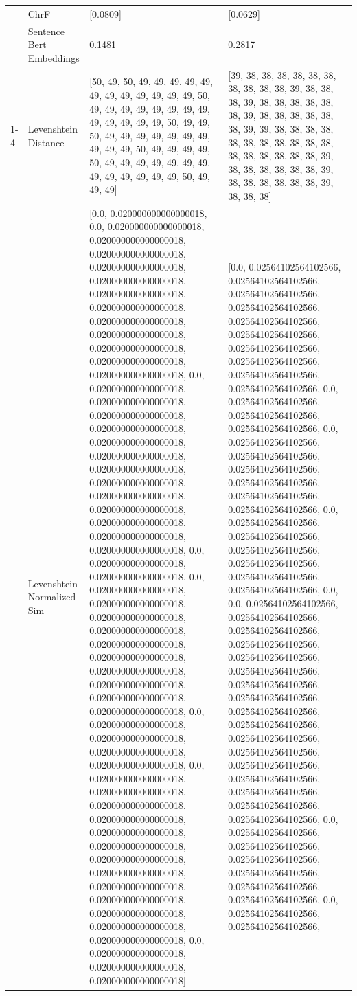\begin{tabular}{llll}
 & ChrF & [0.0809] & [0.0629] \\
 & Sentence Bert Embeddings & 0.1481 & 0.2817 \\
\cline{1-4}
\multirow[t]{4}{*}{Kahii kogi ta ithe kabaritaga ta migwi} & Levenshtein Distance & [50, 49, 50, 49, 49, 49, 49, 49, 49, 49, 49, 49, 49, 49, 49, 50, 49, 49, 49, 49, 49, 49, 49, 49, 49, 49, 49, 49, 49, 50, 49, 49, 50, 49, 49, 49, 49, 49, 49, 49, 49, 49, 49, 50, 49, 49, 49, 49, 50, 49, 49, 49, 49, 49, 49, 49, 49, 49, 49, 49, 49, 49, 50, 49, 49, 49] & [39, 38, 38, 38, 38, 38, 38, 38, 38, 38, 38, 39, 38, 38, 38, 39, 38, 38, 38, 38, 38, 38, 39, 38, 38, 38, 38, 38, 38, 39, 39, 38, 38, 38, 38, 38, 38, 38, 38, 38, 38, 38, 38, 38, 38, 38, 38, 38, 39, 38, 38, 38, 38, 38, 38, 39, 38, 38, 38, 38, 38, 38, 39, 38, 38, 38] \\
 & Levenshtein Normalized Sim & [0.0, 0.020000000000000018, 0.0, 0.020000000000000018, 0.020000000000000018, 0.020000000000000018, 0.020000000000000018, 0.020000000000000018, 0.020000000000000018, 0.020000000000000018, 0.020000000000000018, 0.020000000000000018, 0.020000000000000018, 0.020000000000000018, 0.020000000000000018, 0.0, 0.020000000000000018, 0.020000000000000018, 0.020000000000000018, 0.020000000000000018, 0.020000000000000018, 0.020000000000000018, 0.020000000000000018, 0.020000000000000018, 0.020000000000000018, 0.020000000000000018, 0.020000000000000018, 0.020000000000000018, 0.020000000000000018, 0.0, 0.020000000000000018, 0.020000000000000018, 0.0, 0.020000000000000018, 0.020000000000000018, 0.020000000000000018, 0.020000000000000018, 0.020000000000000018, 0.020000000000000018, 0.020000000000000018, 0.020000000000000018, 0.020000000000000018, 0.020000000000000018, 0.0, 0.020000000000000018, 0.020000000000000018, 0.020000000000000018, 0.020000000000000018, 0.0, 0.020000000000000018, 0.020000000000000018, 0.020000000000000018, 0.020000000000000018, 0.020000000000000018, 0.020000000000000018, 0.020000000000000018, 0.020000000000000018, 0.020000000000000018, 0.020000000000000018, 0.020000000000000018, 0.020000000000000018, 0.020000000000000018, 0.0, 0.020000000000000018, 0.020000000000000018, 0.020000000000000018] & [0.0, 0.02564102564102566, 0.02564102564102566, 0.02564102564102566, 0.02564102564102566, 0.02564102564102566, 0.02564102564102566, 0.02564102564102566, 0.02564102564102566, 0.02564102564102566, 0.02564102564102566, 0.0, 0.02564102564102566, 0.02564102564102566, 0.02564102564102566, 0.0, 0.02564102564102566, 0.02564102564102566, 0.02564102564102566, 0.02564102564102566, 0.02564102564102566, 0.02564102564102566, 0.0, 0.02564102564102566, 0.02564102564102566, 0.02564102564102566, 0.02564102564102566, 0.02564102564102566, 0.02564102564102566, 0.0, 0.0, 0.02564102564102566, 0.02564102564102566, 0.02564102564102566, 0.02564102564102566, 0.02564102564102566, 0.02564102564102566, 0.02564102564102566, 0.02564102564102566, 0.02564102564102566, 0.02564102564102566, 0.02564102564102566, 0.02564102564102566, 0.02564102564102566, 0.02564102564102566, 0.02564102564102566, 0.02564102564102566, 0.02564102564102566, 0.0, 0.02564102564102566, 0.02564102564102566, 0.02564102564102566, 0.02564102564102566, 0.02564102564102566, 0.02564102564102566, 0.0, 0.02564102564102566, 0.02564102564102566, 
\end{tabular}
